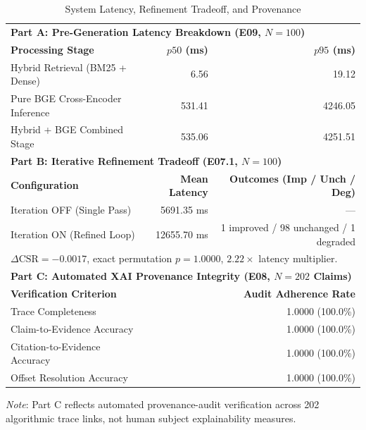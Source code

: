 \begin{table}[t]
\caption{System Latency, Refinement Tradeoff, and Provenance}
\label{tab:latency_refinement_provenance}
\centering
\small
\begin{tabularx}{\columnwidth}{lrr}
\toprule
\multicolumn{3}{l}{\textbf{Part A: Pre-Generation Latency Breakdown (E09, $N=100$)}} \\
\textbf{Processing Stage} & \textbf{$p50$ (ms)} & \textbf{$p95$ (ms)} \\
\midrule
Hybrid Retrieval (BM25 + Dense) & 6.56   & 19.12 \\
Pure BGE Cross-Encoder Inference & 531.41 & 4246.05 \\
Hybrid + BGE Combined Stage      & 535.06 & 4251.51 \\
\midrule
\multicolumn{3}{l}{\textbf{Part B: Iterative Refinement Tradeoff (E07.1, $N=100$)}} \\
\textbf{Configuration} & \textbf{Mean Latency} & \textbf{Outcomes (Imp / Unch / Deg)} \\
\midrule
Iteration OFF (Single Pass) & 5691.35 ms & --- \\
Iteration ON (Refined Loop) & 12655.70 ms & 1 improved / 98 unchanged / 1 degraded \\
\multicolumn{3}{l}{\footnotesize $\Delta\text{CSR} = -0.0017$, exact permutation $p = 1.0000$, $2.22\times$ latency multiplier.} \\
\midrule
\multicolumn{3}{l}{\textbf{Part C: Automated XAI Provenance Integrity (E08, $N=202$ Claims)}} \\
\textbf{Verification Criterion} & \multicolumn{2}{r}{\textbf{Audit Adherence Rate}} \\
\midrule
Trace Completeness             & \multicolumn{2}{r}{1.0000 (100.0\%)} \\
Claim-to-Evidence Accuracy     & \multicolumn{2}{r}{1.0000 (100.0\%)} \\
Citation-to-Evidence Accuracy  & \multicolumn{2}{r}{1.0000 (100.0\%)} \\
Offset Resolution Accuracy     & \multicolumn{2}{r}{1.0000 (100.0\%)} \\
\bottomrule
\end{tabularx}
\vspace{1ex}
\begin{minipage}{\columnwidth}
\footnotesize
\textit{Note}: Part C reflects automated provenance-audit verification across 202 algorithmic trace links, not human subject explainability measures.
\end{minipage}
\end{table}

